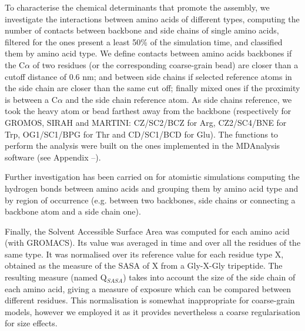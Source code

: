 To characterise the chemical determinants that promote the assembly, we investigate the interactions between amino acids of different types, computing the number of contacts between backbone and side chains of single amino acids, filtered for the ones present a least 50\% of the simulation time, and classified them by amino acid type.
%
We define contacts between amino acids backbones if the C$\alpha$ of two residues (or the corresponding coarse-grain bead) are closer than a cutoff distance of 0.6 nm; and between side chains if selected reference atoms in the side chain are closer than the same cut off; finally mixed ones if the proximity is between a C$\alpha$ and the side chain reference atom. As side chains reference, we took the heavy atom or bead farthest away from the backbone (respectively for GROMOS, SIRAH and MARTINI: CZ/SC2/BCZ for Arg, CZ2/SC4/BNE for Trp, OG1/SC1/BPG for Thr and CD/SC1/BCD for Glu). The functions to perform the analysis were built on the ones implemented in the MDAnalysis software (see Appendix --).

Further investigation has been carried on for atomistic simulations computing the hydrogen bonds between amino acids and grouping them by amino acid type and by region of occurrence (e.g. between two backbones, side chains or connecting a backbone atom and a side chain one).

Finally, the Solvent Accessible Surface Area was computed for each amino acid (with GROMACS). Its value was averaged in time and over all the residues of the same type. It was normalised over its reference value for each residue type X, obtained as the measure of the SASA of X from a Gly-X-Gly tripeptide. The resulting measure (named Q$_{SASA}$) takes into account the size of the side chain of each amino acid, giving a measure of exposure which can be compared between different residues. 
%
This normalisation is somewhat inappropriate for coarse-grain models, however we employed it as it provides nevertheless a coarse regularisation for size effects.


